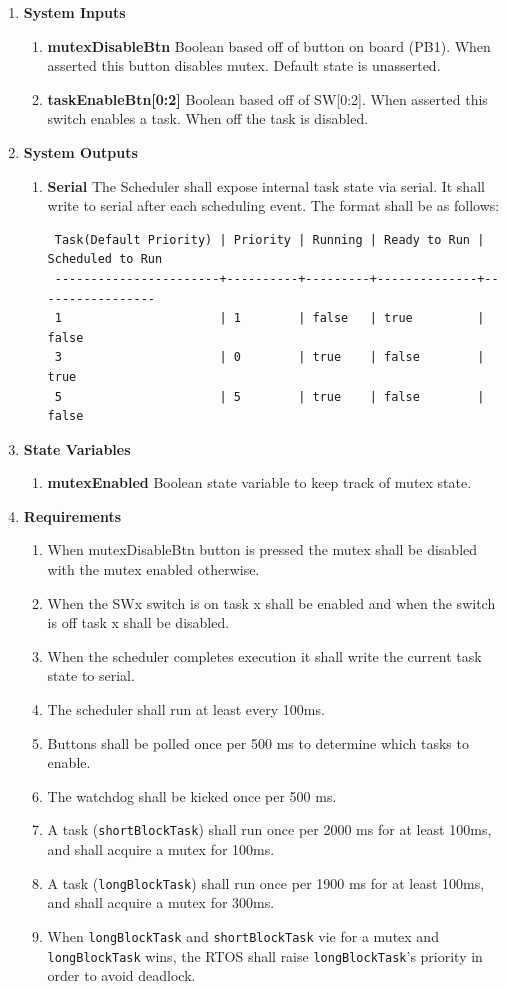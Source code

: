 \documentclass{article}
\newcommand{\bitem}[1]{\item \textbf{#1}}
\begin{document}
\begin{enumerate}
\bitem{System Inputs}
	\begin{enumerate}
	\bitem{mutexDisableBtn} Boolean based off of button on board (PB1). When asserted this button disables mutex. Default state is unasserted.
	\bitem{taskEnableBtn[0:2]} Boolean based off of SW[0:2]. When asserted this switch enables a task. When off the task is disabled.
	\end{enumerate}
\bitem{System Outputs}
	\begin{enumerate}
	\bitem{Serial} The Scheduler shall expose internal task state via serial. It shall write to serial after each scheduling event. The format shall be as follows:
\begin{verbatim}
 Task(Default Priority) | Priority | Running | Ready to Run | Scheduled to Run
 -----------------------+----------+---------+--------------+-----------------
 1                      | 1        | false   | true         | false
 3                      | 0        | true    | false        | true
 5                      | 5        | true    | false        | false
\end{verbatim}
	\end{enumerate}
\bitem{State Variables}
	\begin{enumerate}
	\bitem{mutexEnabled} Boolean state variable to keep track of mutex state.
	\end{enumerate}
\bitem{Requirements}
	\begin{enumerate}
	\item When mutexDisableBtn button is pressed the mutex shall be disabled with the mutex enabled otherwise.
	\item When the SWx switch is on task x shall be enabled and when the switch is off task x shall be disabled.
	\item When the scheduler completes execution it shall write the current task state to serial.
	\item The scheduler shall run at least every 100ms.
	\item Buttons shall be polled once per 500 ms to determine which tasks to enable.
	\item The watchdog shall be kicked once per 500 ms.
	\item A task (\texttt{shortBlockTask}) shall run once per 2000 ms for at least 100ms, and shall acquire a mutex for 100ms.
	\item A task (\texttt{longBlockTask}) shall run once per 1900 ms for at least 100ms, and shall acquire a mutex for 300ms.
	\item When \texttt{longBlockTask} and \texttt{shortBlockTask} vie for a mutex and \texttt{longBlockTask} wins, the RTOS shall raise \texttt{longBlockTask}'s priority in order to avoid deadlock.
	\end{enumerate}
\end{enumerate}
\end{document}
